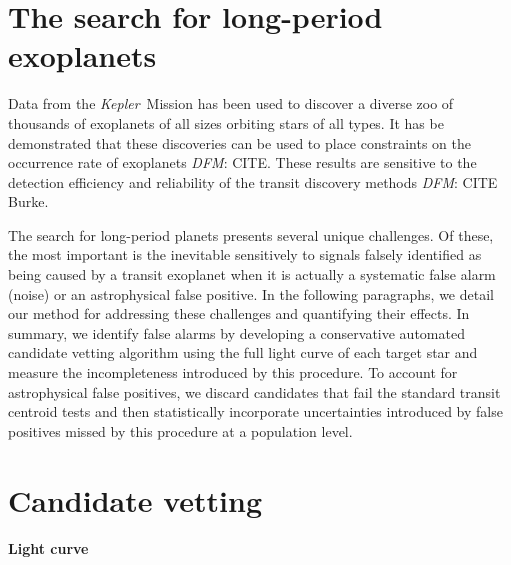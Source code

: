 \documentclass[12pt,preprint]{aastex}
\newcommand{\project}[1]{\textsl{#1}}
\newcommand{\kepler}{\project{Kepler}}
\newcommand{\todo}[3]{{\color{#2}\emph{#1}: #3}}
\newcommand{\dfmtodo}[1]{\todo{DFM}{red}{#1}}
\begin{document}
\section{The search for long-period exoplanets}

Data from the \kepler\ Mission has been used to discover a diverse zoo of
thousands of exoplanets of all sizes orbiting stars of all types.
It has be demonstrated that these discoveries can be used to place constraints
on the occurrence rate of exoplanets \dfmtodo{CITE}.
These results are sensitive to the detection efficiency and reliability of the
transit discovery methods \dfmtodo{CITE Burke}.

The search for long-period planets presents several unique challenges.
Of these, the most important is the inevitable sensitively to signals falsely
identified as being caused by a transit exoplanet when it is actually a
systematic false alarm (noise) or an astrophysical false positive.
In the following paragraphs, we detail our method for addressing these
challenges and quantifying their effects.
In summary, we identify false alarms by developing a conservative automated
candidate vetting algorithm using the full light curve of each target star and
measure the incompleteness introduced by this procedure.
To account for astrophysical false positives, we discard candidates that fail
the standard transit centroid tests and then statistically incorporate
uncertainties introduced by false positives missed by this procedure at a
population level.

\section{Candidate vetting}

\paragraph{Light curve}
\end{document}
